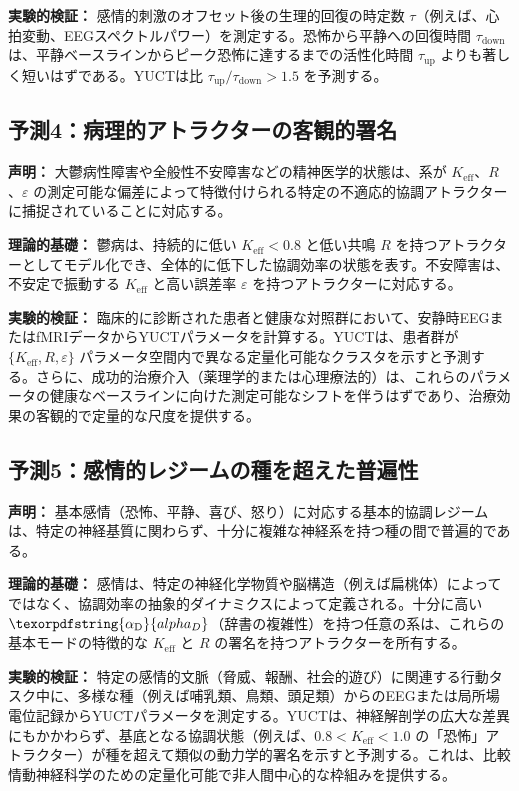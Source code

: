 \documentclass[12pt,a4paper]{article}
\DeclareRobustCommand{\alD}{\texorpdfstring{\ensuremath{\alpha_{\mathrm{D}}}}{alpha_D}}
\begin{document}
	\textbf{実験的検証：} 感情的刺激のオフセット後の生理的回復の時定数 \(\tau\)（例えば、心拍変動、EEGスペクトルパワー）を測定する。恐怖から平静への回復時間 \(\tau_{\text{down}}\) は、平静ベースラインからピーク恐怖に達するまでの活性化時間 \(\tau_{\text{up}}\) よりも著しく短いはずである。YUCTは比 \(\tau_{\text{up}}/\tau_{\text{down}} > 1.5\) を予測する。
	
	\subsection{予測4：病理的アトラクターの客観的署名}
	
	\textbf{声明：} 大鬱病性障害や全般性不安障害などの精神医学的状態は、系が \(K_{\mathrm{eff}}\)、\(R\)、\(\varepsilon\) の測定可能な偏差によって特徴付けられる特定の不適応的協調アトラクターに捕捉されていることに対応する。
	
	\textbf{理論的基礎：} 鬱病は、持続的に低い \(K_{\mathrm{eff}} < 0.8\) と低い共鳴 \(R\) を持つアトラクターとしてモデル化でき、全体的に低下した協調効率の状態を表す。不安障害は、不安定で振動する \(K_{\mathrm{eff}}\) と高い誤差率 \(\varepsilon\) を持つアトラクターに対応する。
	
	\textbf{実験的検証：} 臨床的に診断された患者と健康な対照群において、安静時EEGまたはfMRIデータからYUCTパラメータを計算する。YUCTは、患者群が \(\{K_{\mathrm{eff}}, R, \varepsilon\}\) パラメータ空間内で異なる定量化可能なクラスタを示すと予測する。さらに、成功的治療介入（薬理学的または心理療法的）は、これらのパラメータの健康なベースラインに向けた測定可能なシフトを伴うはずであり、治療効果の客観的で定量的な尺度を提供する。
	
	\subsection{予測5：感情的レジームの種を超えた普遍性}
	
	\textbf{声明：} 基本感情（恐怖、平静、喜び、怒り）に対応する基本的協調レジームは、特定の神経基質に関わらず、十分に複雑な神経系を持つ種の間で普遍的である。
	
	\textbf{理論的基礎：} 感情は、特定の神経化学物質や脳構造（例えば扁桃体）によってではなく、協調効率の抽象的ダイナミクスによって定義される。十分に高い \(\alD\)（辞書の複雑性）を持つ任意の系は、これらの基本モードの特徴的な \(K_{\mathrm{eff}}\) と \(R\) の署名を持つアトラクターを所有する。
	
	\textbf{実験的検証：} 特定の感情的文脈（脅威、報酬、社会的遊び）に関連する行動タスク中に、多様な種（例えば哺乳類、鳥類、頭足類）からのEEGまたは局所場電位記録からYUCTパラメータを測定する。YUCTは、神経解剖学の広大な差異にもかかわらず、基底となる協調状態（例えば、\(0.8 < K_{\mathrm{eff}} < 1.0\) の「恐怖」アトラクター）が種を超えて類似の動力学的署名を示すと予測する。これは、比較情動神経科学のための定量化可能で非人間中心的な枠組みを提供する。
	
\end{document}

